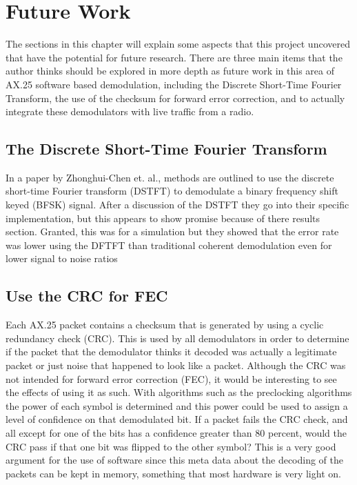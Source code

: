 \chapter{Future Work}
The sections in this chapter will explain some aspects that this project uncovered that have the potential for future research. There are three main items that the author thinks should be explored in more depth as future work in this area of AX.25 software based demodulation, including the Discrete Short-Time Fourier Transform, the use of the checksum for forward error correction, and to actually integrate these demodulators with live traffic from a radio.

\section{The Discrete Short-Time Fourier Transform}
In a paper by Zhonghui-Chen et. al., methods are outlined to use the discrete short-time Fourier transform (DSTFT) to demodulate a binary frequency shift keyed (BFSK) signal. After a discussion of the DSTFT they go into their specific implementation, but this appears to show promise because of there results section. Granted, this was for a simulation but they showed that the error rate was lower using the DFTFT than traditional coherent demodulation even for lower signal to noise ratios \cite{Chen2008}

\section{Use the CRC for FEC}
Each AX.25 packet contains a checksum that is generated by using a cyclic redundancy check (CRC). This is used by all demodulators in order to determine if the packet that the demodulator thinks it decoded was actually a legitimate packet or just noise that happened to look like a packet. Although the CRC was not intended for forward error correction (FEC), it would be interesting to see the effects of using it as such. With algorithms such as the preclocking algorithms the power of each symbol is determined and this power could be used to assign a level of confidence on that demodulated bit. If a packet fails the CRC check, and all except for one of the bits has a confidence greater than 80 percent, would the CRC pass if that one bit was flipped to the other symbol? This is a very good argument for the use of software since this meta data about the decoding of the packets can be kept in memory, something that most hardware is very light on. 


